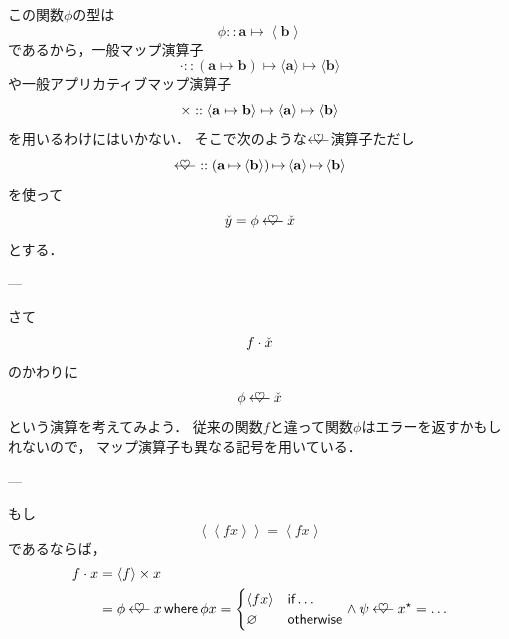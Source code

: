 \documentclass[a4paper]{jsbook}
\newcommand{\mList}[1]{{#1}^\mathrm{\star}}
\DeclareMathOperator{\mMapsTo}{\mapsto}
\newcommand{\mathTypeParameter}[1]{\mathbf{#1}}
\newcommand{\mathContainerVar}[1]{\Check{#1}}
\newcommand{\mathPureWith}[1]{\left\langle#1\right\rangle}
\newcommand{\mathUnitWith}[1]{\left\langle\!\left\langle#1\right\rangle\!\right\rangle}
\newcommand{\mathPureType}[1]{\mathPureWith{\mathTypeParameter{#1}}}
\newcommand{\mathPureNothing}{\varnothing}
\newcommand{\mathAnd}{\mathbin{\wedge}}
\newcommand{\mathApplicativeGeneralMap}{\mathbin{\times}}
\newcommand{\mathBind}{\mathbin{\ooalign{$\longleftarrow$\crcr\hss$\heartsuit$\hss}}}
\newcommand{\mathGeneralMap}{\mathbin{\cdot}}
\newcommand{\mathIn}{\mathrel{::}}
\newcommand{\mathMapsTo}{\mapsto}
\newcommand{\mathKeyword}[1]{\operatorname{\textsf{#1}}}
\newcommand{\mathIf}{\mathKeyword{if}}
\newcommand{\mathOtherwise}{\mathKeyword{otherwise}}
\newcommand{\mathWhere}{\mathKeyword{where}}
\newcommand{\mathMorph}[2]{#1\mathMapsTo#2}
\newcommand{\mathMorphII}[3]{#1\mathMapsTo#2\mathMapsTo#3}
\begin{document}
この関数$\phi$の型は
\begin{equation}
  \phi\mathIn\mathTypeParameter{a}\mMapsTo\mathPureWith{\mathTypeParameter{b}}
\end{equation}
であるから，一般マップ演算子
\begin{equation}
\mathGeneralMap
\mathIn{}\mathMorphII{(\mathMorph{\mathTypeParameter{a}}{\mathTypeParameter{b}})}{\langle\mathTypeParameter{a}\rangle}{\langle\mathTypeParameter{b}\rangle}
\end{equation}
や一般アプリカティブマップ演算子
\begin{equation}
\mathApplicativeGeneralMap
\mathIn{}\mathMorphII{\langle\mathMorph{\mathTypeParameter{a}}{\mathTypeParameter{b}}\rangle}{\langle\mathTypeParameter{a}\rangle}{\langle\mathTypeParameter{b}\rangle}\\
\end{equation}
を用いるわけにはいかない．
そこで次のような$\mathBind$演算子ただし
\begin{equation}
\mathBind
\mathIn
\left(\mathTypeParameter{a}\mMapsTo\mathPureType{b}\right)
\mMapsTo
\mathPureType{a}
\mMapsTo
\mathPureType{b}
\end{equation}
を使って
\begin{equation}
  \mathContainerVar{y}=\phi\mathBind\mathContainerVar{x}
\end{equation}
とする．

---

さて
\begin{equation}
  f\mathGeneralMap\mathContainerVar{x}
\end{equation}
のかわりに
\begin{equation}
  \phi\mathBind\mathContainerVar{x}
\end{equation}
という演算を考えてみよう．
従来の関数$f$と違って関数$\phi$はエラーを返すかもしれないので，
マップ演算子も異なる記号を用いている．

---

もし
\begin{equation}
\mathUnitWith{fx}=\mathPureWith{fx}
\end{equation}
であるならば，
\begin{align}
f\mathGeneralMap x&=\mathPureWith{f}\mathApplicativeGeneralMap x\\
&=\phi\mathBind x\mathWhere \phi x=\begin{cases}
\mathPureWith{fx}&\mathIf\dots\\
\mathPureNothing&\mathOtherwise
\end{cases}
\mathAnd
\psi\mathBind\mList{x}=\dots
\end{align}
\end{document}

